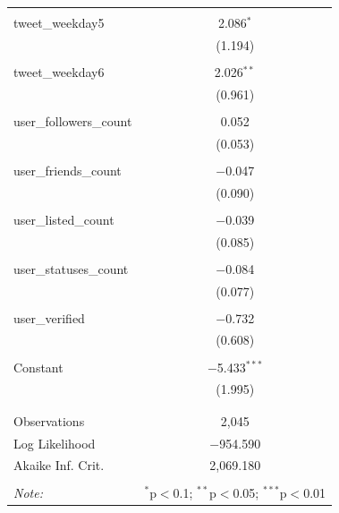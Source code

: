 \documentclass{article}
\begin{document}
\begin{longtable}{@{\extracolsep{10pt}}lc}
  & \\ 
 tweet\_weekday5 & 2.086$^{*}$ \\ 
  & (1.194) \\ 
  & \\ 
 tweet\_weekday6 & 2.026$^{**}$ \\ 
  & (0.961) \\ 
  & \\ 
 user\_followers\_count & 0.052 \\ 
  & (0.053) \\ 
  & \\ 
 user\_friends\_count & $-$0.047 \\ 
  & (0.090) \\ 
  & \\ 
 user\_listed\_count & $-$0.039 \\ 
  & (0.085) \\ 
  & \\ 
 user\_statuses\_count & $-$0.084 \\ 
  & (0.077) \\ 
  & \\ 
 user\_verified & $-$0.732 \\ 
  & (0.608) \\ 
  & \\ 
 Constant & $-$5.433$^{***}$ \\ 
  & (1.995) \\ 
  & \\ 
\hline \\[-1.8ex] 
Observations & 2,045 \\ 
Log Likelihood & $-$954.590 \\ 
Akaike Inf. Crit. & 2,069.180 \\ 
\hline 
\hline \\[-1.8ex] 
\textit{Note:}  & \multicolumn{1}{r}{$^{*}$p$<$0.1; $^{**}$p$<$0.05; $^{***}$p$<$0.01} \\ 
\end{longtable}     




\end{document}
